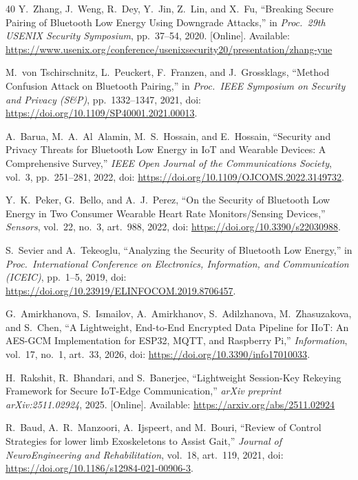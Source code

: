 \documentclass[journal]{IEEEtran}
\begin{document}
\begin{thebibliography}{40}
Y.~Zhang, J.~Weng, R.~Dey, Y.~Jin, Z.~Lin, and X.~Fu, ``Breaking Secure Pairing of Bluetooth Low Energy Using Downgrade Attacks,'' in \emph{Proc.\ 29th USENIX Security Symposium}, pp.~37--54, 2020. [Online]. Available: \url{https://www.usenix.org/conference/usenixsecurity20/presentation/zhang-yue}

M.~von Tschirschnitz, L.~Peuckert, F.~Franzen, and J.~Grossklags, ``Method Confusion Attack on Bluetooth Pairing,'' in \emph{Proc.\ IEEE Symposium on Security and Privacy (S\&P)}, pp.~1332--1347, 2021, doi: \url{https://doi.org/10.1109/SP40001.2021.00013}.

A.~Barua, M.~A.~Al~Alamin, M.~S.~Hossain, and E.~Hossain, ``Security and Privacy Threats for Bluetooth Low Energy in IoT and Wearable Devices: A Comprehensive Survey,'' \emph{IEEE Open Journal of the Communications Society}, vol.~3, pp.~251--281, 2022, doi: \url{https://doi.org/10.1109/OJCOMS.2022.3149732}.

Y.~K.~Peker, G.~Bello, and A.~J.~Perez, ``On the Security of Bluetooth Low Energy in Two Consumer Wearable Heart Rate Monitors/Sensing Devices,'' \emph{Sensors}, vol.~22, no.~3, art.~988, 2022, doi: \url{https://doi.org/10.3390/s22030988}.

S.~Sevier and A.~Tekeoglu, ``Analyzing the Security of Bluetooth Low Energy,'' in \emph{Proc.\ International Conference on Electronics, Information, and Communication (ICEIC)}, pp.~1--5, 2019, doi: \url{https://doi.org/10.23919/ELINFOCOM.2019.8706457}.

G.~Amirkhanova, S.~Ismailov, A.~Amirkhanov, S.~Adilzhanova, M.~Zhasuzakova, and S.~Chen, ``A Lightweight, End-to-End Encrypted Data Pipeline for IIoT: An AES-GCM Implementation for ESP32, MQTT, and Raspberry Pi,'' \emph{Information}, vol.~17, no.~1, art.~33, 2026, doi: \url{https://doi.org/10.3390/info17010033}.


H.~Rakshit, R.~Bhandari, and S.~Banerjee, ``Lightweight Session-Key Rekeying Framework for Secure IoT-Edge Communication,'' \emph{arXiv preprint arXiv:2511.02924}, 2025. [Online]. Available: \url{https://arxiv.org/abs/2511.02924}


R.~Baud, A.~R.~Manzoori, A.~Ijspeert, and M.~Bouri, ``Review of Control Strategies for lower limb Exoskeletons to Assist Gait,'' \emph{Journal of NeuroEngineering and Rehabilitation}, vol.~18, art.~119, 2021, doi: \url{https://doi.org/10.1186/s12984-021-00906-3}.


\end{thebibliography}
\end{document}
